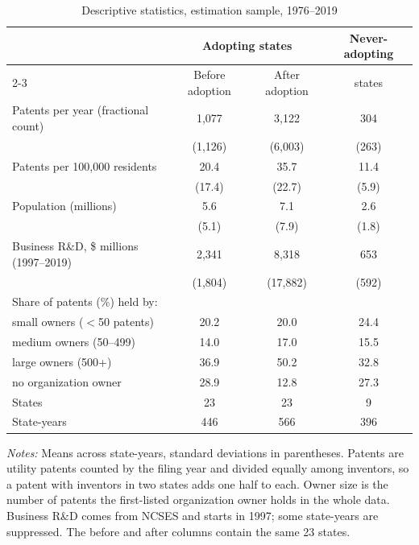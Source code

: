 \begin{table}[t]
\centering
\caption{Descriptive statistics, estimation sample, 1976--2019}
\label{tab:descriptives}
\begin{threeparttable}
\begin{tabular}{lccc}
\toprule
 & \multicolumn{2}{c}{Adopting states} & Never-adopting \\
\cmidrule(lr){2-3}
 & Before adoption & After adoption & states \\
\midrule
Patents per year (fractional count) & 1,077 & 3,122 & 304 \\
 & (1,126) & (6,003) & (263) \\[2pt]
Patents per 100,000 residents & 20.4 & 35.7 & 11.4 \\
 & (17.4) & (22.7) & (5.9) \\[2pt]
Population (millions) & 5.6 & 7.1 & 2.6 \\
 & (5.1) & (7.9) & (1.8) \\[2pt]
Business R\&D, \$ millions (1997--2019) & 2,341 & 8,318 & 653 \\
 & (1,804) & (17,882) & (592) \\[2pt]
Share of patents (\%) held by: & & & \\
\quad small owners ($<$50 patents) & 20.2 & 20.0 & 24.4 \\
\quad medium owners (50--499) & 14.0 & 17.0 & 15.5 \\
\quad large owners (500+) & 36.9 & 50.2 & 32.8 \\
\quad no organization owner & 28.9 & 12.8 & 27.3 \\
\midrule
States & 23 & 23 & 9 \\
State-years & 446 & 566 & 396 \\
\bottomrule
\end{tabular}
\begin{tablenotes}[flushleft]\footnotesize
\item \textit{Notes:} Means across state-years, standard deviations in parentheses. Patents are
utility patents counted by the filing year and divided equally among inventors, so a patent with
inventors in two states adds one half to each. Owner size is the number of patents the first-listed
organization owner holds in the whole data. Business R\&D comes from NCSES and starts in 1997;
some state-years are suppressed. The before and after columns contain the same 23 states.
\end{tablenotes}
\end{threeparttable}
\end{table}
